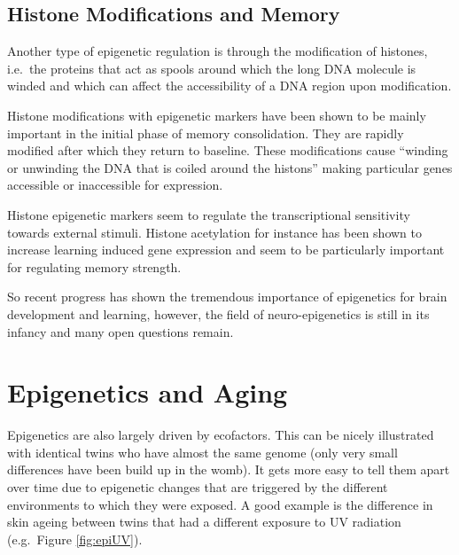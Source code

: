 \documentclass[
  11pt,
]{book}
\begin{document}
\hypertarget{histone-modifications-and-memory}{%
\subsection{Histone Modifications and Memory}\label{histone-modifications-and-memory}}

Another type of epigenetic regulation is through the modification of histones, i.e.~the proteins that act as spools around which the long DNA molecule is winded and which can affect the accessibility of a DNA region upon modification.

Histone modifications with epigenetic markers have been shown to be mainly important in the initial phase of memory consolidation. They are rapidly modified after which they return to baseline. These modifications cause ``winding or unwinding the DNA that is coiled around the histons'' making particular genes accessible or inaccessible for expression.

Histone epigenetic markers seem to regulate the transcriptional sensitivity towards external stimuli. Histone acetylation for instance has been shown to increase learning induced gene expression and seem to be particularly important for regulating memory strength.

So recent progress has shown the tremendous importance of epigenetics for brain development and learning, however, the field of neuro-epigenetics is still in its infancy and many open questions remain.

\hypertarget{epigenetics-and-aging}{%
\section{Epigenetics and Aging}\label{epigenetics-and-aging}}

Epigenetics are also largely driven by ecofactors. This can be nicely illustrated with identical twins who have almost the same genome (only very small differences have been build up in the womb). It gets more easy to tell them apart over time due to epigenetic changes that are triggered by the different environments to which they were exposed. A good example is the difference in skin ageing between twins that had a different exposure to UV radiation (e.g.~Figure \ref{fig:epiUV}).
\end{document}
